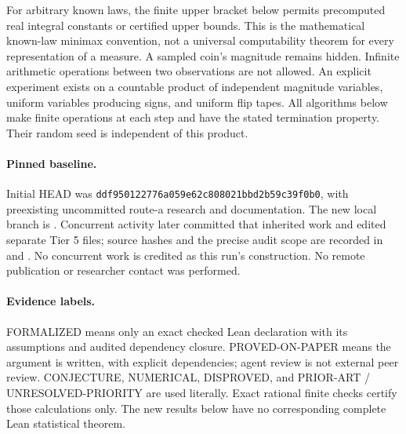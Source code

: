 \documentclass[11pt]{article}
\begin{document}
For arbitrary known laws, the finite upper bracket below permits precomputed
real integral constants or certified upper bounds. This is the mathematical
known-law minimax convention, not a universal computability theorem for every
representation of a measure. A sampled coin's magnitude remains hidden.
Infinite arithmetic operations between two observations are not allowed.
An explicit experiment exists on a countable product of independent magnitude
variables, uniform variables producing signs, and uniform flip tapes. All
algorithms below make finite operations at each step and have the stated
termination property. Their random seed is independent of this product.

\paragraph{Pinned baseline.}
Initial HEAD was \texttt{ddf950122776a059e62c808021bbd2b59c39f0b0}, with
preexisting uncommitted route-a research and documentation.
The new local branch is .
Concurrent activity later
committed that inherited work and edited separate Tier 5 files; source hashes
and the precise audit scope are recorded in  and
. No concurrent work is credited as this run's
construction. No remote publication or researcher contact was performed.

\paragraph{Evidence labels.}
FORMALIZED means only an exact checked Lean declaration with its assumptions
and audited dependency closure. PROVED-ON-PAPER means the argument is written,
with explicit dependencies; agent review is not external peer review.
CONJECTURE, NUMERICAL, DISPROVED, and PRIOR-ART / UNRESOLVED-PRIORITY are
used literally. Exact rational finite checks certify those calculations only.
The new results below have no corresponding complete Lean statistical theorem.
\end{document}
